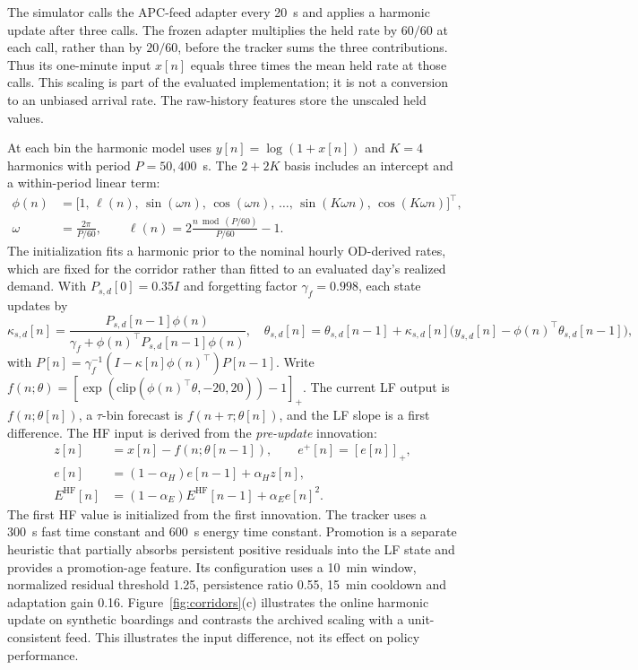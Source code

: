 The simulator calls the APC-feed adapter every 20~s and applies a harmonic update after three calls. The frozen adapter multiplies the held rate by $60/60$ at each call, rather than by $20/60$, before the tracker sums the three contributions. Thus its one-minute input $x[n]$ equals three times the mean held rate at those calls. This scaling is part of the evaluated implementation; it is not a conversion to an unbiased arrival rate. The raw-history features store the unscaled held values.

At each bin the harmonic model uses $y[n]=\log(1+x[n])$ and $K=4$ harmonics with period $P=50{,}400$~s. The $2+2K$ basis includes an intercept and a within-period linear term:
\begin{equation}
  \begin{aligned}
  \phi(n)&=\bigl[1,\,\ell(n),\,\sin(\omega n),\,\cos(\omega n),\,\ldots,\,
                 \sin(K\omega n),\,\cos(K\omega n)\bigr]^\top,\\
  \omega&=\frac{2\pi}{P/60}, \qquad \ell(n)=2\frac{n\bmod(P/60)}{P/60}-1.
  \end{aligned}
  \label{eq:fourier_basis}
\end{equation}
The initialization fits a harmonic prior to the nominal hourly OD-derived rates, which are fixed for the corridor rather than fitted to an evaluated day's realized demand. With $P_{s,d}[0]=0.35I$ and forgetting factor $\gamma_f=0.998$, each state updates by
\begin{equation}
  \kappa_{s,d}[n] = \frac{P_{s,d}[n-1]\phi(n)}{\gamma_f + \phi(n)^\top P_{s,d}[n-1]\phi(n)},
  \quad
  \theta_{s,d}[n] = \theta_{s,d}[n-1] + \kappa_{s,d}[n]\bigl(y_{s,d}[n] - \phi(n)^\top \theta_{s,d}[n-1]\bigr),
  \label{eq:rls_update}
\end{equation}
with $P[n] = \gamma_f^{-1}(I-\kappa[n]\phi(n)^\top)P[n-1]$. Write $f(n;\theta)=[\exp(\mathrm{clip}(\phi(n)^\top\theta,-20,20))-1]_+$. The current LF output is $f(n;\theta[n])$, a $\tau$-bin forecast is $f(n+\tau;\theta[n])$, and the LF slope is a first difference. The HF input is derived from the \emph{pre-update} innovation:
\begin{equation}
  \begin{aligned}
  z[n] &= x[n] - f(n;\theta[n-1]), \qquad e^+[n]=[e[n]]_+,\\
  e[n] &= (1-\alpha_H)e[n-1]+\alpha_H z[n],\\
  E^{\mathrm{HF}}[n] &= (1-\alpha_E)E^{\mathrm{HF}}[n-1]+\alpha_E e[n]^2.
  \end{aligned}
  \label{eq:hf_residual}
\end{equation}
The first HF value is initialized from the first innovation. The tracker uses a 300~s fast time constant and 600~s energy time constant. Promotion is a separate heuristic that partially absorbs persistent positive residuals into the LF state and provides a promotion-age feature. Its configuration uses a 10~min window, normalized residual threshold 1.25, persistence ratio 0.55, 15~min cooldown and adaptation gain 0.16. Figure~\ref{fig:corridors}(c) illustrates the online harmonic update on synthetic boardings and contrasts the archived scaling with a unit-consistent feed. This illustrates the input difference, not its effect on policy performance.


